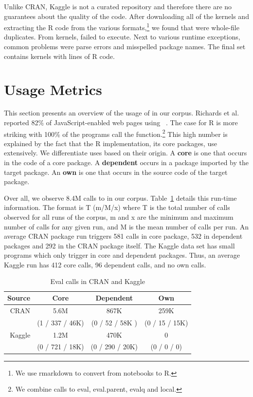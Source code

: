 \documentclass[conference]{IEEEtran}
\newcommand{\AllAllCallCountRnd}{8.4M\xspace}
\begin{document}
Unlike CRAN, Kaggle is not a curated repository and therefore there are no
guarantees about the quality of the code. After downloading all of the
\CorpusKaggle kernels and extracting the R code from the various
formats,\footnote{We use {\sf rmarkdown} to convert from notebooks to R.} we
found that \CorpusDuplicatedKaggle were whole-file duplicates. From
\CorpusRunnableKaggle kernels, \CorpusFailedKaggle failed to execute. Next
to various runtime exceptions, common problems were parse errors and
misspelled package names.  The final set contains \CorpusFinishedKaggle
kernels with  lines of R code.

\section{Usage Metrics}

This section presents an overview of the usage of \eval in our corpus.
Richards et al. reported 82\% of JavaScript-enabled web pages using
\eval~\cite{ecoop11}. The case for R is more striking with 100\% of the
programs call the \eval function.\footnote{We combine calls to {\sf eval},
  {\sf eval.parent}, {\sf evalq} and {\sf local}.}  This high number is
explained by the fact that the R implementation, its core packages, use
\eval extensively. We differentiate uses based on their origin. A {\bf core}
\eval is one that occurs in the code of a core package.  A {\bf dependent}
\eval occurs in a package imported by the target package. An {\bf own} \eval
is one that occurs in the source code of the target package.



Over all, we observe \AllAllCallCountRnd calls to \eval in our corpus.
Table~\ref{A} details this run-time information. The format is T (m/M/x)
where T is the total number of calls observed for all runs of the corpus, m
and x are the minimum and maximum number of calls for any given run, and M
is the mean number of calls per run. An average CRAN package run triggers
581 {\eval} calls in core package, 532 in dependent packages and 292 in the
CRAN package itself.  The Kaggle data set has small programs which only
trigger \eval in core and dependent packages. Thus, an average Kaggle run
has 412 core calls, 96 dependent calls, and no own calls.


\begin{table}[!h] \centering
 \begin{tabular}{r|c|c|c} \hline
Source & Core    & Dependent                      & Own \\\hline
CRAN   & 5.6M &  867K    & 259K \\
       & (1 / 337 / 46K)& (0 / 52 / 58K ) & (0 / 15 / 15K) \\\hline
Kaggle &  1.2M &  470K   & 0\\
 &  (0 / 721 / 18K) & (0 / 290 / 20K) & (0 / 0 / 0)\\\hline
\end{tabular}\caption{Eval calls in CRAN and Kaggle}\label{A}\end{table}
\end{document}

